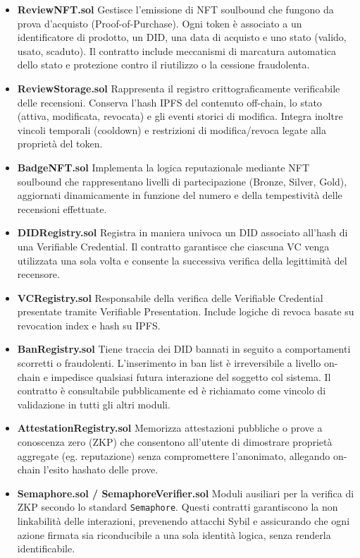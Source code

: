            \begin{itemize}
                \item \textbf{ReviewNFT.sol} Gestisce l'emissione di NFT soulbound che fungono da prova d'acquisto (Proof-of-Purchase). Ogni token è associato a un identificatore di prodotto, un DID, una data di acquisto e uno stato (valido, usato, scaduto). Il contratto include meccanismi di marcatura automatica dello stato e protezione contro il riutilizzo o la cessione fraudolenta.

                \item \textbf{ReviewStorage.sol} Rappresenta il registro crittograficamente verificabile delle recensioni. Conserva l’hash IPFS del contenuto off-chain, lo stato (attiva, modificata, revocata) e gli eventi storici di modifica. Integra inoltre vincoli temporali (cooldown) e restrizioni di modifica/revoca legate alla proprietà del token.

                \item \textbf{BadgeNFT.sol} Implementa la logica reputazionale mediante NFT soulbound che rappresentano livelli di partecipazione (Bronze, Silver, Gold), aggiornati dinamicamente in funzione del numero e della tempestività delle recensioni effettuate.

                \item \textbf{DIDRegistry.sol} Registra in maniera univoca un DID associato all’hash di una Verifiable Credential. Il contratto garantisce che ciascuna VC venga utilizzata una sola volta e consente la successiva verifica della legittimità del recensore.

                \item \textbf{VCRegistry.sol} Responsabile della verifica delle Verifiable Credential presentate tramite Verifiable Presentation. Include logiche di revoca basate su revocation index e hash su IPFS.

                \item \textbf{BanRegistry.sol} Tiene traccia dei DID bannati in seguito a comportamenti scorretti o fraudolenti. L'inserimento in ban list è irreversibile a livello on-chain e impedisce qualsiasi futura interazione del soggetto col sistema. Il contratto è consultabile pubblicamente ed è richiamato come vincolo di validazione in tutti gli altri moduli.

                \item \textbf{AttestationRegistry.sol} Memorizza attestazioni pubbliche o prove a conoscenza zero (ZKP) che consentono all'utente di dimostrare proprietà aggregate (eg. reputazione) senza compromettere l'anonimato, allegando on-chain l'esito hashato delle prove.

                \item \textbf{Semaphore.sol / SemaphoreVerifier.sol} Moduli ausiliari per la verifica di ZKP secondo lo standard \texttt{Semaphore}. Questi contratti garantiscono la non linkabilità delle interazioni, prevenendo attacchi Sybil e assicurando che ogni azione firmata sia riconducibile a una sola identità logica, senza renderla identificabile.
            \end{itemize}

